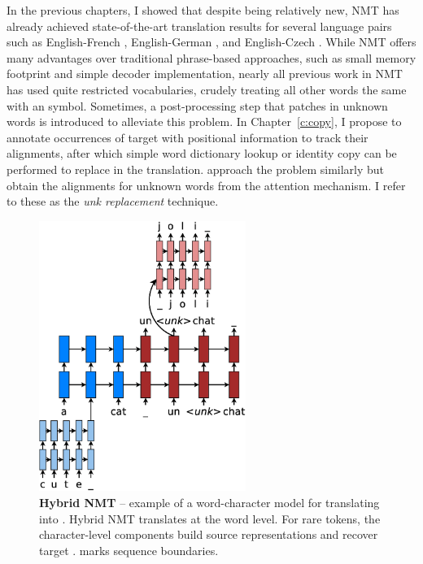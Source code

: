 \begin{sloppypar}
In the previous chapters, I showed that despite being relatively new, NMT has already
achieved state-of-the-art translation results for several language pairs 
such as English-French \cite{luong15}, English-German
\cite{jean15,luong15attn,luong15iwslt}, and English-Czech \cite{jean15wmt}. 
While NMT offers many advantages over traditional phrase-based approaches, such as
small memory footprint and simple decoder implementation, nearly all previous
work in NMT has used quite restricted vocabularies, crudely treating all other
words the same with an \unk{} symbol. Sometimes, a post-processing step that
patches in unknown words is introduced to alleviate this problem. %
In Chapter~\ref{c:copy}, I propose to annotate occurrences of target \unk{} with positional information to
track their alignments, after which simple word dictionary
lookup or identity copy can be performed to replace \unk{} in the translation.
 approach the problem similarly but obtain the alignments for unknown
words from the attention mechanism. I refer to these as the {\it
unk replacement} technique.
\end{sloppypar}

\begin{figure}%
\centering
\includegraphics[width=0.6\textwidth, clip=true, trim= 0 0 0 0]{img/5-nmt_hybrid}
\caption[Hybrid NMT]{{\bf Hybrid NMT} -- example of a word-character model for translating
 into . Hybrid NMT translates at the word level. For rare tokens,
the character-level components build source representations
and recover target \unk{}. \word{\_} marks sequence
boundaries.}
\label{f:hybrid}
\end{figure}


